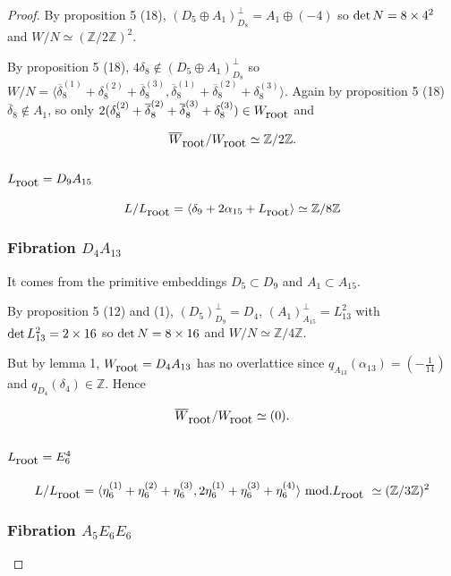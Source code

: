 \documentclass{amsart}
\begin{document}
\begin{proof}
By proposition 5 (18), $(D_5\oplus A_1)_{D_8}^{\perp}=A_1\oplus (-4)$ so $\hbox{det}\,N=8\times 4^2$ and $W/N\simeq (\mathbb Z/2\mathbb Z)^2$.

By proposition 5 (18), $4\delta_8 \notin (D_5\oplus A_1)_{D_8}^{\perp}$ so $W/N=\langle  \overline{\delta}_8^{(1)}+ {\delta}_8^{(2)}+\overline{\delta}_8^{(3)}, \overline{\delta}_8^{(1)}+\overline {\delta}_8^{(2)}+{\delta}_8^{(3)}\rangle $. Again by proposition 5 (18) $\overline{\delta}_8 \notin A_1$, so only $2( \delta_8^{(2)}+\overline {\delta}_8^{(2)}+\overline{\delta}_8^{(3)}+\delta_8^{(3)})\in W_{\hbox{root}}$ and



$$\overline{W}_{\hbox{root}}/W_{\hbox{root}}\simeq \mathbb Z /2\mathbb Z.$$


\subsection{$L_{\hbox{root}}=D_9A_{15}$}


$$L/L_{\hbox{root}}=\langle \delta_9+2\alpha_{15}+L_{\hbox{root}} \rangle \simeq \mathbb Z/8 \mathbb Z$$

\subsubsection{ Fibration $D_4A_{13}$}
It comes from the primitive embeddings $D_5 \subset D_9$ and $A_1 \subset A_{15}$.

By proposition 5 (12) and (1), $(D_5)_{D_9}^{\perp}=D_4$, $(A_1)_{A_{15}}^{\perp}=L_{13}^2$ with $\hbox{det}\, L_{13}^2=2\times 16$ so $\hbox{det}\,N=8\times 16$ and $W/N \simeq \mathbb Z/4 \mathbb Z$.

But by lemma 1, $W_{\hbox{root}}=D_4A_{13}$ has no overlattice since $q_{A_{13}}(\alpha_{13})=\left (-\frac {1}{14} \right )$ and $q_{D_4}(\delta_4) \in \mathbb Z$. Hence

$$\overline{W}_{\hbox{root}}/W_{\hbox{root}}\simeq (0).$$



\subsection{$L_{\hbox{root}}=E_6^4$}

$$L/L_{\hbox{root}}=\langle \eta_6^{(1)}+\eta_6^{(2)}+\eta_6^{(3)}, 2\eta_6^{(1)}+\eta_6^{(3)}+\eta_6^{(4)} \rangle \,\,\hbox{mod.} L_{\hbox{root}} \,\,\simeq (\mathbb Z/3 \mathbb Z)^2$$

\subsubsection{Fibration $A_5 E_6 E_6$}


\end{proof}
\end{document}
